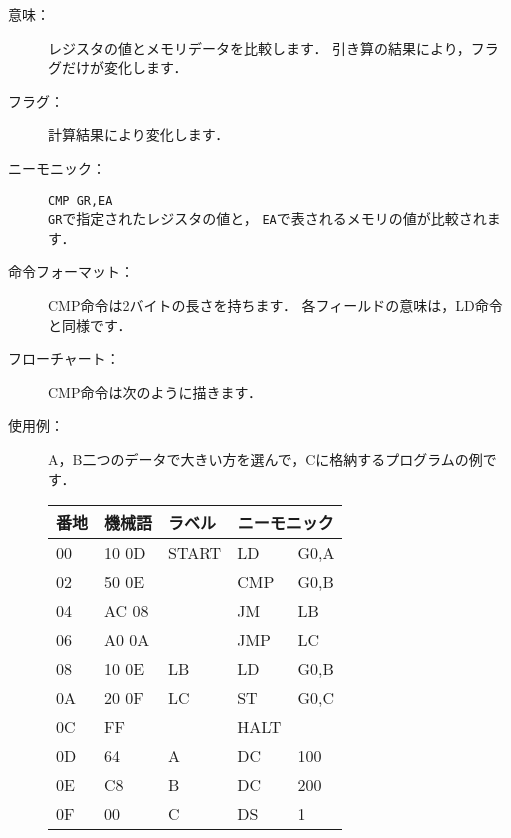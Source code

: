 \begin{description}
\item[意味：]レジスタの値とメモリデータを比較します．
引き算の結果により，フラグだけが変化します．

\item[フラグ：]計算結果により変化します．

\item[ニーモニック：]{\tt CMP  GR,EA} \\
{\tt GR}で指定されたレジスタの値と，
{\tt EA}で表されるメモリの値が比較されます．

\item[命令フォーマット：]CMP命令は2バイトの長さを持ちます．
各フィールドの意味は，LD命令と同様です．


\item[フローチャート：]CMP命令は次のように描きます．

\begin{center}
\end{center}

\item[使用例：]
A，B二つのデータで大きい方を選んで，Cに格納するプログラムの例です．

{\tt\begin{center}
\begin{tabular}{|l|l|l|l l|} \hline
番地 & 機械語 & ラベル & \multicolumn{2}{|c|}{ニーモニック} \\
\hline
00 & 10 0D & START & LD   & G0,A \\
02 & 50 0E &       & CMP  & G0,B \\
04 & AC 08 &       & JM   & LB   \\
06 & A0 0A &       & JMP  & LC   \\
08 & 10 0E & LB    & LD   & G0,B \\
0A & 20 0F & LC    & ST   & G0,C \\
0C & FF    &       & HALT & \\
0D & 64    & A     & DC   & 100  \\
0E & C8    & B     & DC   & 200  \\
0F & 00    & C     & DS   & 1    \\
\hline
\end{tabular}
\end{center}}
\end{description}

